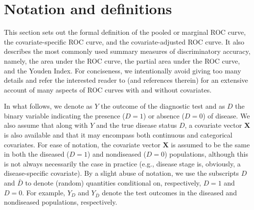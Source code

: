 \section{Notation and definitions} \label{sec:notation}
This section sets out the formal definition of the pooled or marginal ROC curve, the covariate-specific ROC curve, and the covariate-adjusted ROC curve. It also describes the most commonly used summary measures of discriminatory accuracy, namely, the area under the ROC curve, the partial area under the ROC curve, and the Youden Index. For conciseness, we intentionally avoid giving too many details and refer the interested reader to \cite{Pepe03} (and references therein) for an extensive account of many aspects of ROC curves with and without covariates.

In what follows, we denote as $Y$ the outcome of the diagnostic test and as $D$ the binary variable indicating the presence ($D = 1$) or absence ($D = 0$) of disease. We also assume that along with $Y$ and the true disease status $D$, a covariate vector $\mathbf{X}$ is also available and that it may encompass both continuous and categorical covariates. For ease of notation, the covariate vector $\mathbf{X}$ is assumed to be the same in both the diseased ($D = 1$) and nondiseased ($D = 0$) populations, although this is not always necessarily the case in practice (e.g., disease stage is, obviously, a disease-specific covariate). By a slight abuse of notation, we use the subscripts $D$ and $\bar{D}$ to denote (random) quantities conditional on, respectively, $D = 1$ and $D = 0$. For example, $Y_{D}$ and $Y_{\bar{D}}$ denote the test outcomes in the diseased and nondiseased populations, respectively.

